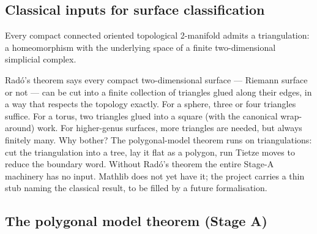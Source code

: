 \subsection{Classical inputs for surface classification}

\begin{theorem}
\label{input:rado-triangulation}
Every compact connected oriented topological 2-manifold admits a
triangulation: a homeomorphism with the underlying space of a finite
two-dimensional simplicial complex.
\notready
\end{theorem}

\begin{layman}
Radó's theorem says every compact two-dimensional surface — Riemann
surface or not — can be cut into a finite collection of triangles
glued along their edges, in a way that respects the topology
exactly. For a sphere, three or four triangles suffice. For a
torus, two triangles glued into a square (with the canonical wrap-
around) work. For higher-genus surfaces, more triangles are needed,
but always finitely many. Why bother? The polygonal-model theorem
runs on triangulations: cut the triangulation into a tree, lay it
flat as a polygon, run Tietze moves to reduce the boundary word.
Without Radó's theorem the entire Stage-A machinery has no input.
Mathlib does not yet have it; the project carries a thin
 stub naming the classical result, to be
filled by a future formalisation.
\end{layman}

\subsection{The polygonal model theorem (Stage A)}


